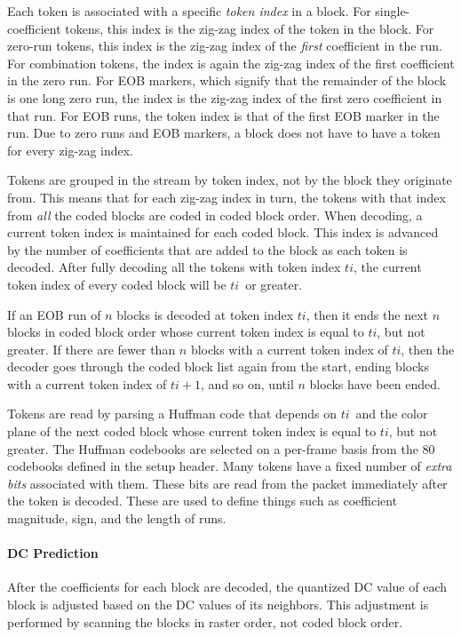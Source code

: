 \documentclass[9pt,letterpaper]{book}
\newcommand{\idx}[1]{{\ensuremath{\mathit{#1}}}}
\newcommand{\ti}{\idx{ti}}
\newcommand{\term}[1]{{\em #1}}
\numberwithin{equation}{chapter}
\numberwithin{figure}{chapter}
\numberwithin{table}{chapter}
\begin{document}
Each token is associated with a specific \term{token index} in a block.
For single-coefficient tokens, this index is the zig-zag index of the token in
 the block.
For zero-run tokens, this index is the zig-zag index of the {\em first}
 coefficient in the run.
For combination tokens, the index is again the zig-zag index of the first
 coefficient in the zero run.
For EOB markers, which signify that the remainder of the block is one long zero
 run, the index is the zig-zag index of the first zero coefficient in that run.
For EOB runs, the token index is that of the first EOB marker in the run.
Due to zero runs and EOB markers, a block does not have to have a token for
 every zig-zag index.

Tokens are grouped in the stream by token index, not by the block they
 originate from.
This means that for each zig-zag index in turn, the tokens with that index from
 {\em all} the coded blocks are coded in coded block order.
When decoding, a current token index is maintained for each coded block.
This index is advanced by the number of coefficients that are added to the
 block as each token is decoded.
After fully decoding all the tokens with token index \ti, the current token
 index of every coded block will be \ti\ or greater.

If an EOB run of $n$ blocks is decoded at token index \ti, then it ends the
 next $n$ blocks in coded block order whose current token index is equal to
 \ti, but not greater.
If there are fewer than $n$ blocks with a current token index of \ti, then the
 decoder goes through the coded block list again from the start, ending blocks
 with a current token index of $\ti+1$, and so on, until $n$ blocks have been
 ended.

Tokens are read by parsing a Huffman code that depends on \ti\ and the color
 plane of the next coded block whose current token index is equal to \ti, but
 not greater.
The Huffman codebooks are selected on a per-frame basis from the 80 codebooks
 defined in the setup header.
Many tokens have a fixed number of \term{extra bits} associated with them.
These bits are read from the packet immediately after the token is decoded.
These are used to define things such as coefficient magnitude, sign, and the
 length of runs.

\paragraph{DC Prediction}

After the coefficients for each block are decoded, the quantized DC value of
 each block is adjusted based on the DC values of its neighbors.
This adjustment is performed by scanning the blocks in raster order, not coded
 block order.
\end{document}
